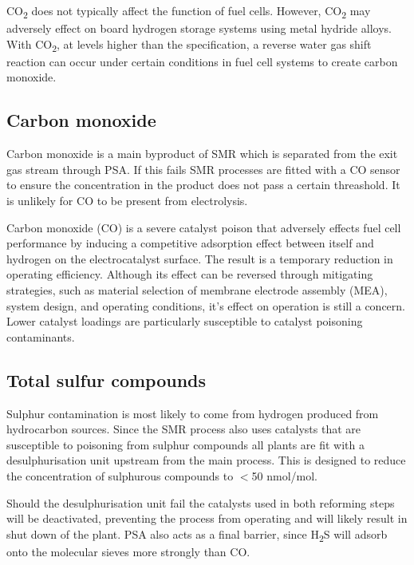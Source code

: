 CO\textsubscript{2} does not typically affect the function of fuel cells. However, CO\textsubscript{2} may adversely effect on board hydrogen storage systems using metal hydride alloys. With CO\textsubscript{2}, at levels higher than the specification, a reverse water gas shift reaction can occur under certain conditions in fuel cell systems to create carbon monoxide. \cite{InternationalStandardISO14687-2:20122012}

\subsection*{Carbon monoxide}
Carbon monoxide is a main byproduct of SMR which is separated from the exit gas stream through PSA. \cite{Muradov2015} If this fails SMR processes are fitted with a CO sensor to ensure the concentration in the product does not pass a certain threashold. \cite{Bacquart2018} It is unlikely for CO to be present from electrolysis.

Carbon monoxide (CO) is a severe catalyst poison that adversely effects fuel cell performance by inducing a competitive adsorption effect between itself and hydrogen on the electrocatalyst surface. The result is a temporary reduction in operating efficiency. \cite{InternationalStandardISO14687-2:20122012} Although its effect can be reversed through mitigating strategies, such as material selection of membrane electrode assembly (MEA), system design, and operating conditions, it's effect on operation is still a concern. Lower catalyst loadings are particularly susceptible to catalyst poisoning contaminants.

\subsection*{Total sulfur compounds}
Sulphur contamination is most likely to come from hydrogen produced from hydrocarbon sources. 
Since the SMR process also uses catalysts that are susceptible to poisoning from sulphur compounds all plants are fit with a desulphurisation unit upstream from the main process. \cite{Muradov2015} This is designed to reduce the concentration of sulphurous compounds to $<$50 nmol/mol. \cite{Bacquart2018}

Should the desulphurisation unit fail the catalysts used in both reforming steps will be deactivated, preventing the process from operating and will likely result in shut down of the plant. PSA also acts as a final barrier, since H\textsubscript{2}S will adsorb onto the molecular sieves more strongly than CO. \cite{Bacquart2018}


